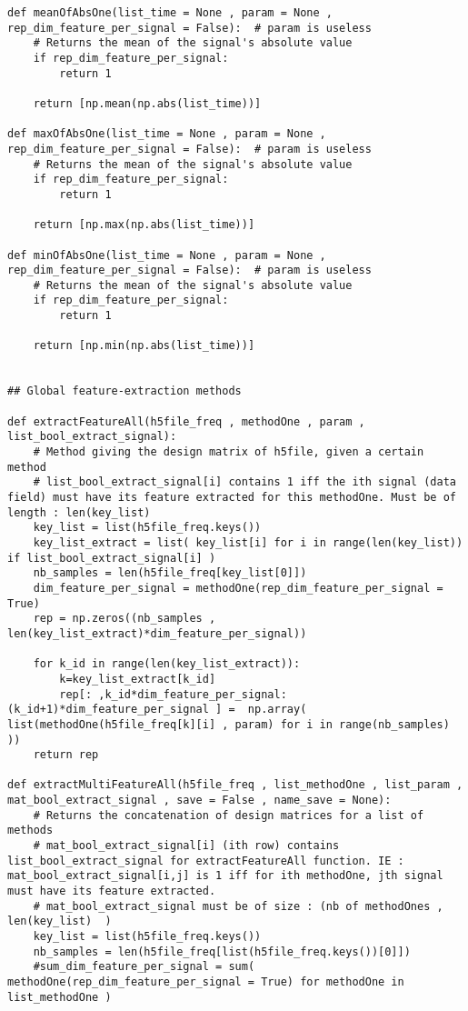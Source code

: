 \documentclass{article}
\begin{document}
\begin{lstlisting}
def meanOfAbsOne(list_time = None , param = None , rep_dim_feature_per_signal = False):  # param is useless
    # Returns the mean of the signal's absolute value
    if rep_dim_feature_per_signal:
        return 1

    return [np.mean(np.abs(list_time))]
    
def maxOfAbsOne(list_time = None , param = None , rep_dim_feature_per_signal = False):  # param is useless
    # Returns the mean of the signal's absolute value
    if rep_dim_feature_per_signal:
        return 1

    return [np.max(np.abs(list_time))]

def minOfAbsOne(list_time = None , param = None , rep_dim_feature_per_signal = False):  # param is useless
    # Returns the mean of the signal's absolute value
    if rep_dim_feature_per_signal:
        return 1

    return [np.min(np.abs(list_time))]


## Global feature-extraction methods
    
def extractFeatureAll(h5file_freq , methodOne , param , list_bool_extract_signal):
    # Method giving the design matrix of h5file, given a certain method
    # list_bool_extract_signal[i] contains 1 iff the ith signal (data field) must have its feature extracted for this methodOne. Must be of length : len(key_list)
    key_list = list(h5file_freq.keys())
    key_list_extract = list( key_list[i] for i in range(len(key_list)) if list_bool_extract_signal[i] )
    nb_samples = len(h5file_freq[key_list[0]])
    dim_feature_per_signal = methodOne(rep_dim_feature_per_signal = True)
    rep = np.zeros((nb_samples , len(key_list_extract)*dim_feature_per_signal))
    
    for k_id in range(len(key_list_extract)):
        k=key_list_extract[k_id]
        rep[: ,k_id*dim_feature_per_signal:(k_id+1)*dim_feature_per_signal ] =  np.array( list(methodOne(h5file_freq[k][i] , param) for i in range(nb_samples)  ))
    return rep

def extractMultiFeatureAll(h5file_freq , list_methodOne , list_param , mat_bool_extract_signal , save = False , name_save = None):
    # Returns the concatenation of design matrices for a list of methods
    # mat_bool_extract_signal[i] (ith row) contains list_bool_extract_signal for extractFeatureAll function. IE : mat_bool_extract_signal[i,j] is 1 iff for ith methodOne, jth signal must have its feature extracted. 
    # mat_bool_extract_signal must be of size : (nb of methodOnes , len(key_list)  )
    key_list = list(h5file_freq.keys())
    nb_samples = len(h5file_freq[list(h5file_freq.keys())[0]])
    #sum_dim_feature_per_signal = sum( methodOne(rep_dim_feature_per_signal = True) for methodOne in list_methodOne )
    

\end{lstlisting}
\end{document}
